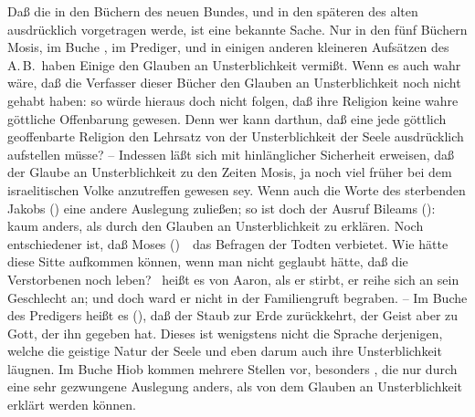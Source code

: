 \begin{aufza}
\item Daß die  in den Büchern des neuen Bundes, und in den späteren des alten ausdrücklich vorgetragen werde, ist eine bekannte Sache. Nur in den fünf Büchern Mosis, im Buche , im Prediger, und in einigen anderen kleineren Aufsätzen des A.\,B.\ haben Einige den Glauben an Unsterblichkeit vermißt. Wenn es auch wahr wäre, daß die Verfasser dieser Bücher den Glauben an Unsterblichkeit noch nicht gehabt haben: so würde hieraus doch nicht folgen, daß ihre Religion keine wahre göttliche Offenbarung gewesen. Denn wer kann darthun, daß eine jede göttlich geoffenbarte Religion den Lehrsatz von der Unsterblichkeit der Seele ausdrücklich aufstellen müsse? -- Indessen läßt sich mit hinlänglicher Sicherheit erweisen, daß der Glaube an Unsterblichkeit zu den Zeiten Mosis, ja noch viel früher bei dem israelitischen Volke anzutreffen gewesen sey. Wenn auch die Worte des sterbenden Jakobs () eine andere Auslegung zuließen; so ist doch der Ausruf Bileams ():  kaum anders, als durch den Glauben an Unsterblichkeit zu erklären. Noch entschiedener ist, daß Moses ()~\ das Befragen der Todten verbietet. Wie hätte diese Sitte aufkommen können, wenn man nicht geglaubt hätte, daß die Verstorbenen noch leben? \ heißt es von Aaron, als er stirbt, er reihe sich an sein Geschlecht an; und doch ward er nicht in der Familiengruft begraben. -- Im Buche des Predigers heißt es (), daß der Staub zur Erde zurückkehrt, der Geist aber zu Gott, der ihn gegeben hat. Dieses ist wenigstens nicht die Sprache derjenigen, welche die geistige Natur der Seele und eben darum auch ihre Unsterblichkeit läugnen. Im Buche Hiob kommen mehrere Stellen vor, besonders , die nur durch eine sehr gezwungene Auslegung anders, als von dem Glauben an Unsterblichkeit erklärt werden können.
\end{aufza}

